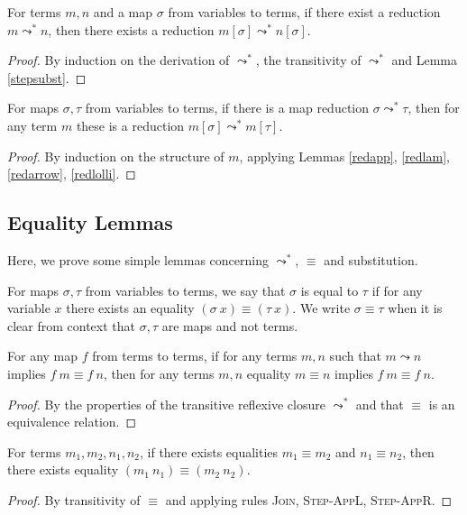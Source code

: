 \documentclass[sigplan,screen,review,anonymous]{acmart}
\newcommand{\rname}[1]{\textsc{\footnotesize #1}}
\newcommand{\step}{\leadsto}
\newcommand{\red}{\leadsto^*}
\begin{document}
\begin{lemma}\label{redsubst}
  For terms $m, n$ and a map $\sigma$ from variables to terms, if there exist a reduction $m \red n$, then there exists a reduction $m[\sigma] \red n[\sigma]$.
\end{lemma}
\begin{proof}
  By induction on the derivation of $\red$, the transitivity of $\red$ and Lemma \ref{stepsubst}.
\end{proof}

\begin{lemma}\label{redcompat}
  For maps $\sigma, \tau$ from variables to terms, if there is a map reduction $\sigma \red \tau$, then for any term $m$ these is a reduction $m[\sigma] \red m[\tau]$.
\end{lemma}
\begin{proof}
  By induction on the structure of $m$, applying Lemmas \ref{redapp}, \ref{redlam}, \ref{redarrow}, \ref{redlolli}.
\end{proof}

\subsection{Equality Lemmas}
Here, we prove some simple lemmas concerning $\red$, $\equiv$ and substitution.

\begin{definition}
  For maps $\sigma, \tau$ from variables to terms, we say that $\sigma$ is equal to $\tau$ if for any variable $x$ there exists an equality $(\sigma\ x) \equiv (\tau\ x)$. We write $\sigma \equiv \tau$ when it is clear from context that $\sigma, \tau$ are maps and not terms.
\end{definition}

\begin{lemma}\label{convhom}
  For any map $f$ from terms to terms, if for any terms $m, n$ such that $m \step n$ implies $f\ m \equiv f\ n$, then for any terms $m, n$ equality $m \equiv n$ implies $f\ m \equiv f\ n$.
\end{lemma}
\begin{proof}
  By the properties of the transitive reflexive closure $\red$ and that $\equiv$ is an equivalence relation.
\end{proof}

\begin{lemma}\label{convapp}
  For terms $m_1, m_2, n_1, n_2$, if there exists equalities $m_1 \equiv m_2$ and $n_1 \equiv n_2$, then there exists equality $(m_1\ n_1) \equiv (m_2\ n_2)$.
\end{lemma}
\begin{proof}
  By transitivity of $\equiv$ and applying rules \rname{Join}, \rname{Step-AppL}, \rname{Step-AppR}.
\end{proof}
\end{document}
